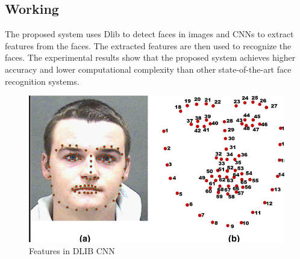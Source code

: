 \subsection*{Working}
The proposed system uses Dlib to detect faces in images and CNNs to extract features from the faces. The extracted features are then used to recognize the faces. The experimental results show that the proposed system achieves higher accuracy and lower computational complexity than other state-of-the-art face recognition systems.
\begin{figure}[!htb]
    \centering
    \includegraphics[width=\linewidth]{Figures/Ch01/facerec.png}
    \caption{Features in DLIB CNN}
    \label{figure:DLIB}
    \end{figure}







